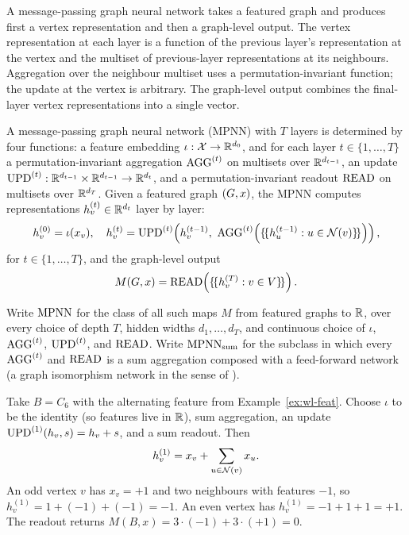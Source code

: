 A message-passing graph neural network takes a featured graph and
produces first a vertex representation and then a graph-level output.
The vertex representation at each layer is a function of the previous
layer's representation at the vertex and the multiset of previous-layer
representations at its neighbours. Aggregation over the neighbour
multiset uses a permutation-invariant function; the update at the
vertex is arbitrary. The graph-level output combines the final-layer
vertex representations into a single vector.

\begin{definition}\label{def:mpnn}
A message-passing graph neural network (MPNN) with $T$ layers is
determined by four functions: a feature embedding $\iota :
\mathcal{X} \to \mathbb{R}^{d_0}$, and for each layer $t \in \{1, \dots, T\}$
a permutation-invariant aggregation $\mathrm{AGG}^{(t)}$ on multisets over
$\mathbb{R}^{d_{t-1}}$, an update $\mathrm{UPD}^{(t)} : \mathbb{R}^{d_{t-1}} \times
\mathbb{R}^{d_{t-1}} \to \mathbb{R}^{d_t}$, and a permutation-invariant readout
$\mathrm{READ}$ on multisets over $\mathbb{R}^{d_T}$. Given a featured graph
$(G, x)$, the MPNN computes representations $h_v^{(t)} \in
\mathbb{R}^{d_t}$ layer by layer:
\[
h_v^{(0)} = \iota(x_v),
\quad
h_v^{(t)} = \upd^{(t)}\!\left(h_v^{(t-1)},\ \agg^{(t)}\!\left(\{\!\{h_u^{(t-1)} : u \in \neigh{v}\}\!\}\right)\right),
\]
for $t \in \{1, \dots, T\}$, and the graph-level output
\[
M(G, x) = \mathrm{READ}\!\left(\{\!\{h_v^{(T)} : v \in V\}\!\}\right).
\]
\end{definition}

Write $\mathrm{MPNN}$ for the class of all such maps $M$ from featured graphs
to $\mathbb{R}$, over every choice of depth $T$, hidden widths $d_1, \dots,
d_T$, and continuous choice of $\iota$, $\mathrm{AGG}^{(t)}$, $\mathrm{UPD}^{(t)}$,
and $\mathrm{READ}$. Write $\mathrm{MPNN}_{\mathrm{sum}}$ for the subclass in
which every $\mathrm{AGG}^{(t)}$ and $\mathrm{READ}$ is a sum aggregation composed
with a feed-forward network (a graph isomorphism network in the sense
of \citet{XuGIN2019}).

\begin{example}\label{ex:mpnn-c6}
Take $B = C_6$ with the alternating feature from Example~\ref{ex:wl-feat}.
Choose $\iota$ to be the identity (so features live in $\mathbb{R}$), sum
aggregation, an update $\mathrm{UPD}^{(1)}(h_v, s) = h_v + s$, and a sum
readout. Then
\[
h_v^{(1)} = x_v + \sum_{u \in \mathcal{N}(v)} x_u.
\]
An odd vertex $v$ has $x_v = +1$ and two neighbours with features
$-1$, so $h_v^{(1)} = 1 + (-1) + (-1) = -1$. An even vertex has
$h_v^{(1)} = -1 + 1 + 1 = +1$. The readout returns
$M(B, x) = 3 \cdot (-1) + 3 \cdot (+1) = 0$.
\end{example}

